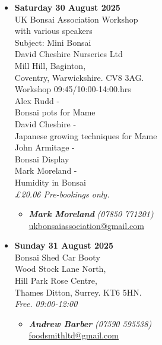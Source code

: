 \begin{itemize}
    \item \textbf{Saturday 30 August 2025}
    \\
    UK Bonsai Association Workshop \\
    with various speakers \\
    Subject: Mini Bonsai \\
    David Cheshire Nurseries Ltd \\
    Mill Hill, Baginton, \\
    Coventry, Warwickshire. CV8 3AG. \\
    Workshop 09:45/10:00-14:00.hrs \\
    Alex Rudd - \\
    Bonsai pots for Mame \\
    David Cheshire - \\
    Japanese growing techniques for Mame \\
    John Armitage - \\
    Bonsai Display \\
    Mark Moreland - \\
    Humidity in Bonsai
    \\
    \emph{£20.06 Pre-bookings only.}
    \begin{itemize}
        \item \textbf{\emph{Mark Moreland}} \emph{(07850 771201)} \\
        \href{mailto:ukbonsaiassociation@gmail.com}{ukbonsaiassociation@gmail.com} 
    \end{itemize}

    \item \textbf{Sunday 31 August 2025}
    \\
    Bonsai Shed Car Booty \\
    Wood Stock Lane North, \\
    Hill Park Rose Centre, \\
    Thames Ditton, Surrey. KT6 5HN.
    \\
    \emph{Free. 09:00-12:00}
    \begin{itemize}
        \item \textbf{\emph{Andrew Barber}} \emph{(07590 595538)} \\
        \href{mailto:foodsmithltd@gmail.com}{foodsmithltd@gmail.com} 
    \end{itemize}


\end{itemize}
